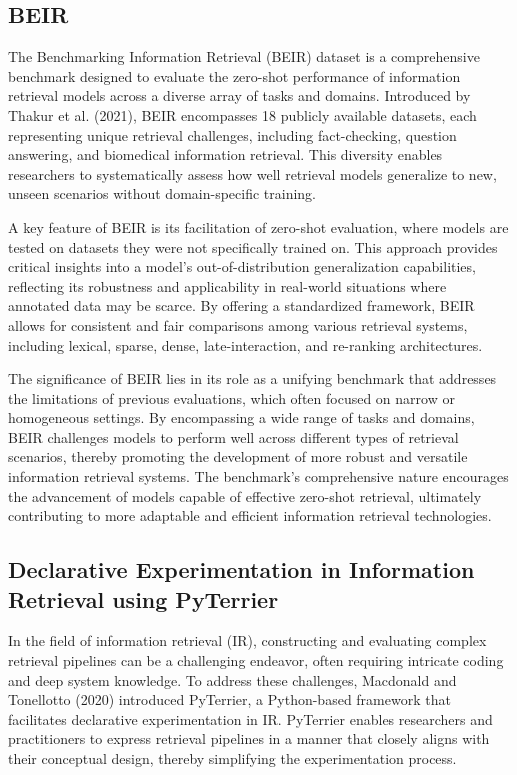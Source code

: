 \subsection{BEIR}

The Benchmarking Information Retrieval (BEIR) dataset is a comprehensive benchmark designed to evaluate the zero-shot performance of information retrieval models across a diverse array of tasks and domains. Introduced by Thakur et al. (2021), BEIR encompasses 18 publicly available datasets, each representing unique retrieval challenges, including fact-checking, question answering, and biomedical information retrieval. This diversity enables researchers to systematically assess how well retrieval models generalize to new, unseen scenarios without domain-specific training.

A key feature of BEIR is its facilitation of zero-shot evaluation, where models are tested on datasets they were not specifically trained on. This approach provides critical insights into a model's out-of-distribution generalization capabilities, reflecting its robustness and applicability in real-world situations where annotated data may be scarce. By offering a standardized framework, BEIR allows for consistent and fair comparisons among various retrieval systems, including lexical, sparse, dense, late-interaction, and re-ranking architectures.

The significance of BEIR lies in its role as a unifying benchmark that addresses the limitations of previous evaluations, which often focused on narrow or homogeneous settings. By encompassing a wide range of tasks and domains, BEIR challenges models to perform well across different types of retrieval scenarios, thereby promoting the development of more robust and versatile information retrieval systems. The benchmark's comprehensive nature encourages the advancement of models capable of effective zero-shot retrieval, ultimately contributing to more adaptable and efficient information retrieval technologies.

\subsection{Declarative Experimentation in Information Retrieval using PyTerrier}

In the field of information retrieval (IR), constructing and evaluating complex retrieval pipelines can be a challenging endeavor, often requiring intricate coding and deep system knowledge. To address these challenges, Macdonald and Tonellotto (2020) introduced PyTerrier, a Python-based framework that facilitates declarative experimentation in IR. PyTerrier enables researchers and practitioners to express retrieval pipelines in a manner that closely aligns with their conceptual design, thereby simplifying the experimentation process.

